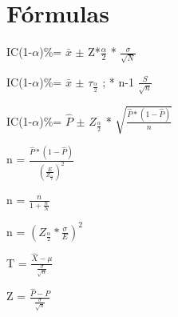 \section*{\centering Fórmulas}

\begin{center}
    IC(1-$\alpha$)\%= $\bar{x}$ $\pm$ Z*$\frac{\alpha}{2}$ * $\frac{\sigma}{\sqrt{N}}$

    IC(1-$\alpha$)\%= $\bar{x}$ $\pm$ $\tau_\frac{\alpha}{2}$ ; * n-1 $\frac{S}{\sqrt{n}}$

    IC(1-$\alpha$)\%= $\hat{P}$ $\pm$ $Z_\frac{\alpha}{2}$ * $\sqrt{\frac{\hat{P}*(1-\hat{P})}{n}}$

    n = $\frac{\hat{P}*(1-\hat{P})}{(\frac{E}{Z_\frac{\alpha}{2}})^2}$

    n = $\frac{n}{1+ \frac{n}{N}}$

    n = $(Z_\frac{\alpha}{2} * \frac{\sigma}{E})^2$

    T = $\frac{\hat{X}-\mu}{\frac{\sigma}{\sqrt{n}}}$

    Z = $\frac{\hat{P}-P}{\frac{\sigma}{\sqrt{n}}}$
\end{center}